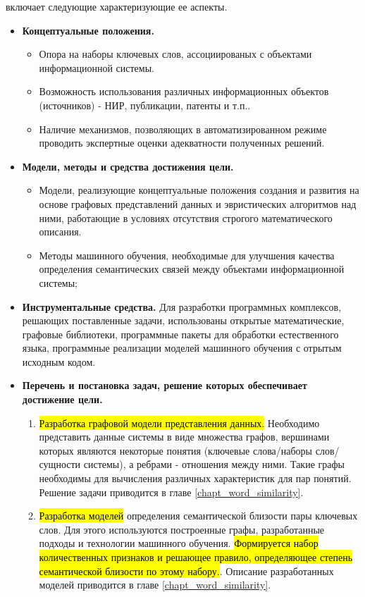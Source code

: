 {\methods} включает следующие характеризующие ее аспекты.
\begin{itemize}
    \item \textbf{Концептуальные положения.} 
        \begin{itemize}
            \item Опора на наборы ключевых слов, ассоциированых с объектами информационной системы.
            \item Возможность использования различных информационных объектов (источников) - НИР, публикации, патенты и т.п..
            \item Наличие механизмов, позволяющих в автоматизированном режиме проводить экспертные оценки адекватности полученных решений.
        \end{itemize}
    \item \textbf{Модели, методы и средства достижения цели.}
        \begin{itemize}
            \item Модели, реализующие концептуальные положения создания и развития на основе графовых представлений данных и эвристических алгоритмов над ними, работающие в условиях отсутствия строгого математического описания.
            \item Методы машинного обучения, необходимые для улучшения качества определения семантических связей между объектами информационной системы;
        \end{itemize}
    \item \textbf{Инструментальные средства.} Для разработки программных комплексов, решающих поставленные задачи, использованы открытые математические, графовые библиотеки, программные пакеты для обработки естественного языка, программные реализации моделей машинного обучения с отрытым исходным кодом.
    \item \textbf{Перечень и постановка задач, решение которых обеспечивает достижение цели.}
        \begin{enumerate}
        \item \hl{Разработка графовой модели представления данных.} Необходимо представить данные системы в виде множества графов, вершинами которых являются некоторые понятия (ключевые слова/наборы слов/сущности системы), а ребрами - отношения между ними. Такие графы необходимы для вычисления различных характеристик для пар понятий. Решение задачи приводится в главе \ref{chapt_word_similarity}.
        \item \hl{Разработка моделей} определения семантической близости пары ключевых слов. Для этого используются построенные графы, разработанные подходы и технологии машинного обучения. \hl{Формируется набор количественных признаков и решающее правило, определяющее степень семантической близости по этому набору.}. Описание разработанных моделей приводится в главе {\ref{chapt_word_similarity}}.

\end{enumerate}
\end{itemize}
